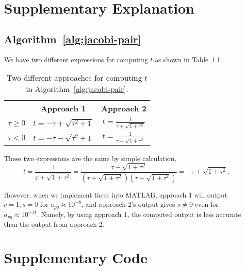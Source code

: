 \chapter{Supplementary Explanation}
\section{Algorithm~\ref{alg:jacobi-pair}}
\label{app:algorithm-jacobi-pair}
We have two different expressions for computing $t$ as shown in Table~\ref{tab:different-approaches-for-t}.
\begin{table}[ht]
  \centering 
  \caption{Two different approaches for computing $t$ in Algorithm~\ref{alg:jacobi-pair}.}
  \label{tab:different-approaches-for-t}
  \begin{tabular}{ccc}
    \toprule 
    & Approach 1 & Approach 2 \\ \midrule  
    $\tau \geq 0$ & $ t = - \tau + \sqrt{\tau^2 + 1}$ & $\displaystyle t = \frac{1}{\tau + \sqrt{1 + \tau^2}}$ \\ \midrule 
    $\tau < 0 $ &$ t = - \tau - \sqrt{\tau^2 + 1}$ & 
    $\displaystyle t = \frac{1}{\tau - \sqrt{1 + \tau^2}}$\\
    \bottomrule
  \end{tabular}
\end{table}

These two expressions are the same by simple calculation,
\begin{equation}
  t=\frac{1}{\tau+\sqrt{1+\tau^{2}}}=\frac{\tau-\sqrt{1+\tau^{2}}}{\left(\tau+\sqrt{1+\tau^{2}}\right)\left(\tau-\sqrt{1+\tau^{2}}\right)}=-\tau+\sqrt{1+\tau^{2}}.
\end{equation}

However, when we implement these into MATLAB, approach 1 will output $c = 1, s = 0$ for $a_{pq} \approx 10^{-8}$, and approach 2's output gives $s \neq 0$ even for $a_{pq} \approx 10^{-14}$. Namely, by using approach 1, the computed output is less accurate than the output from approach 2.

\chapter{Supplementary Code}

